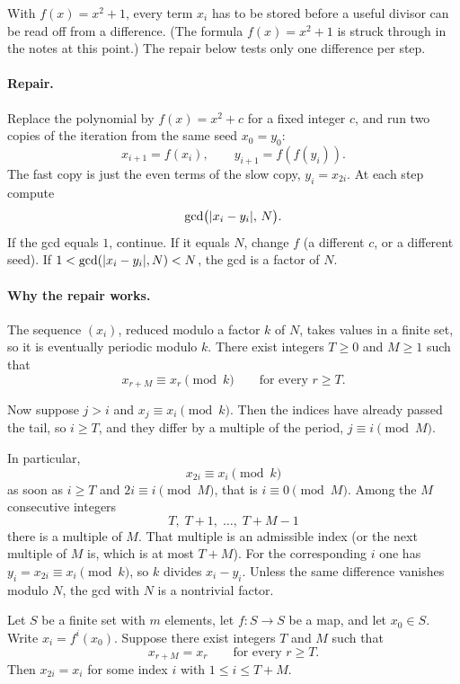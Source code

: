 \begin{remark}
With $f(x)=x^2+1$, every term $x_i$ has to be stored before a useful divisor can be read off from a difference. (The formula $f(x)=x^2+1$ is struck through in the notes at this point.) The repair below tests only one difference per step.
\end{remark}

\paragraph{Repair.}
Replace the polynomial by $f(x)=x^2+c$ for a fixed integer $c$, and run two copies of the iteration from the same seed $x_0=y_0$:
\[
    x_{i+1}=f(x_i), \qquad y_{i+1}=f(f(y_i)).
\]
The fast copy is just the even terms of the slow copy, $y_i=x_{2i}$. At each step compute
\[
    \operatorname{gcd}\bigl(|x_i-y_i|,\, N\bigr).
\]
If the gcd equals $1$, continue. If it equals $N$, change $f$ (a different $c$, or a different seed). If $1<\operatorname{gcd}(|x_i-y_i|,N)<N$, the gcd is a factor of $N$.

\paragraph{Why the repair works.}
The sequence $(x_i)$, reduced modulo a factor $k$ of $N$, takes values in a finite set, so it is eventually periodic modulo $k$. There exist integers $T\ge 0$ and $M\ge 1$ such that
\begin{equation}
    x_{r+M}\equiv x_r\pmod{k}
    \qquad\text{for every }r\ge T.
    \label{eq:period}
\end{equation}


Now suppose $j>i$ and $x_j\equiv x_i\pmod{k}$. Then the indices have already passed the tail, so $i\ge T$, and they differ by a multiple of the period, $j\equiv i\pmod{M}$.

In particular,
\[
    x_{2i}\equiv x_i\pmod{k}
\]
as soon as $i\ge T$ and $2i\equiv i\pmod{M}$, that is $i\equiv 0\pmod{M}$. Among the $M$ consecutive integers
\[
    T,\; T+1,\; \ldots,\; T+M-1
\]
there is a multiple of $M$. That multiple is an admissible index (or the next multiple of $M$ is, which is at most $T+M$). For the corresponding $i$ one has $y_i=x_{2i}\equiv x_i\pmod{k}$, so $k$ divides $x_i-y_i$. Unless the same difference vanishes modulo $N$, the gcd with $N$ is a nontrivial factor.

\begin{theorem}
Let $S$ be a finite set with $m$ elements, let $f\colon S\to S$ be a map, and let $x_0\in S$. Write $x_i=f^{i}(x_0)$. Suppose there exist integers $T$ and $M$ such that
\[
    x_{r+M}=x_r \qquad\text{for every }r\ge T.
\]
Then $x_{2i}=x_i$ for some index $i$ with $1\le i\le T+M$.
\end{theorem}

